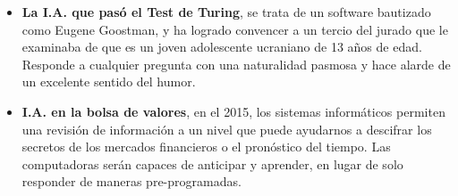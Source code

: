 \documentclass[a4paper,11pt, spanish]{report}
\begin{document}
\begin{itemize}
  \item \textbf{La I.A. que pasó el Test de Turing}, se trata de un software bautizado como Eugene Goostman, y ha logrado convencer a un tercio del jurado que le examinaba de que es un joven adolescente ucraniano de 13 años de edad. Responde a cualquier pregunta con una naturalidad pasmosa y hace alarde de un excelente sentido del humor. 
  \item \textbf{I.A. en la bolsa de valores}, en el 2015, los sistemas informáticos permiten una revisión de información a un nivel que puede ayudarnos a descifrar los secretos de los mercados financieros o el pronóstico del tiempo. Las computadoras serán capaces de anticipar y aprender, en lugar de solo responder de maneras pre-programadas.
\end{itemize}

\nocite{*}


\end{document}
